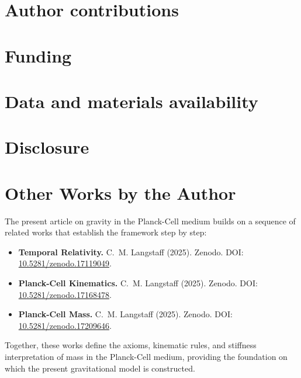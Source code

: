\documentclass[11pt,oneside]{article}
\begin{document}
\section*{Author contributions}

\section*{Funding}

\section*{Data and materials availability}

\section*{Disclosure}

\clearpage
\section*{Other Works by the Author}

The present article on gravity in the Planck-Cell medium builds on a sequence of related works that establish the framework step by step:

\begin{itemize}
  \item \textbf{Temporal Relativity.}  
  C.~M. Langstaff (2025). Zenodo.  
  DOI: \href{https://doi.org/10.5281/zenodo.17119049}{10.5281/zenodo.17119049}.
  
  \item \textbf{Planck-Cell Kinematics.}  
  C.~M. Langstaff (2025). Zenodo.  
  DOI: \href{https://doi.org/10.5281/zenodo.17168478}{10.5281/zenodo.17168478}.
  
  \item \textbf{Planck-Cell Mass.}  
  C.~M. Langstaff (2025). Zenodo.  
  DOI: \href{https://doi.org/10.5281/zenodo.17209646}{10.5281/zenodo.17209646}.
\end{itemize}

Together, these works define the axioms, kinematic rules, and stiffness interpretation of mass in the Planck-Cell medium, providing the foundation on which the present gravitational model is constructed.

\clearpage
\nocite{*} %


\end{document}
